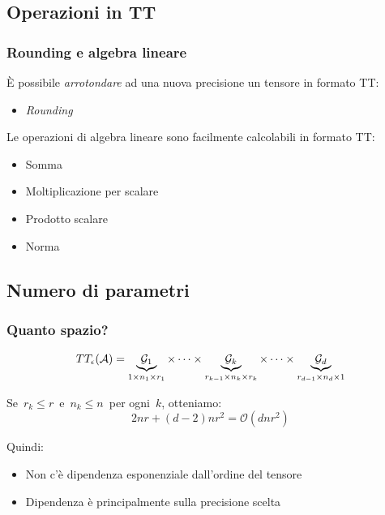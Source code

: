 \documentclass[compress]{beamer}
\theoremstyle{definition}
\theoremstyle{plain}
\begin{document}
\subsection{Operazioni in TT}
\begin{frame}
\frametitle{Rounding e algebra lineare}
\`E possibile \emph{arrotondare} ad una nuova precisione un tensore in formato TT:
\begin{itemize}
	\item \emph{Rounding}
\end{itemize}

\pause
\vspace{3mm}
Le operazioni di algebra lineare sono facilmente calcolabili in formato TT:
\begin{itemize}
\item Somma
\item Moltiplicazione per scalare
\item Prodotto scalare
\item Norma
\end{itemize}
\end{frame}

\subsection{Numero di parametri}
\begin{frame}
\frametitle{Quanto spazio?}
\begin{equation*}
	TT_\epsilon(\mathcal{A}) = 
	\underbrace{\mathcal{G}_1}_{1 \times n_1 \times r_1}
	\times \cdots \times
	\underbrace{\mathcal{G}_k}_{r_{k-1} \times n_k \times r_k}
	\times \cdots \times 
	\underbrace{\mathcal{G}_d}_{r_{d-1} \times n_d \times 1}
\end{equation*}	

\vspace{5mm}
Se $\,r_k \leq r\,$ e $\,n_k \leq n\,$ per ogni $\,k$, otteniamo:
\begin{equation*}
	2nr + (d-2)nr^2 = \mathcal{O}(dnr^2)
\end{equation*}

Quindi:
\begin{itemize}
	\item Non c'è dipendenza esponenziale dall'ordine del tensore
	\item Dipendenza è principalmente sulla precisione scelta
\end{itemize}
\end{frame}
\end{document}
